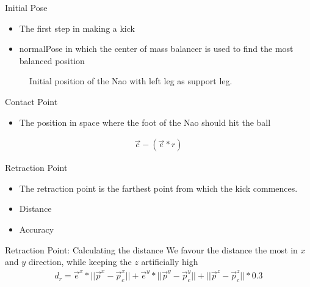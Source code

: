 \documentclass{beamer}
\begin{document}
\begin{frame}{Initial Pose}
    \begin{itemize}
        \item The first step in making a kick
        \item normalPose in which the center of mass balancer is used to find
            the most balanced position
    \end{itemize}

    \begin{figure}[htbp]
      \centering
      \caption{Initial position of the Nao with left leg as support leg.}
    \end{figure}
\end{frame}

\begin{frame}{Contact Point}
    \begin{itemize}
        \item The position in space where the foot of the Nao should hit the ball
    \end{itemize}

    \begin{align*}
        \vec{c} - ( \vec{e} * r )
    \end{align*}
\end{frame}


\begin{frame}{Retraction Point} 
    \begin{itemize}
        \item      The retraction point is the farthest point from which the kick commences.
        \item      Distance
        \item      Accuracy
    \end{itemize}
\end{frame}


\begin{frame}{Retraction Point: Calculating the distance} 
    We favour the distance the most in $x$ and $y$ direction, while keeping the
    $z$ artificially high
        \begin{align}
            d_r = \vec{e}^{x} * || \vec{p}^{x} -\vec{p}_{c}^{x}|| + \vec{e}^y *
        ||\vec{p}^{y} - \vec{p}_{c}^y|| +  ||
     \vec{p}^z - \vec{p}_{c}^z|| * 0.3
        \end{align}
\end{frame}
\end{document}
